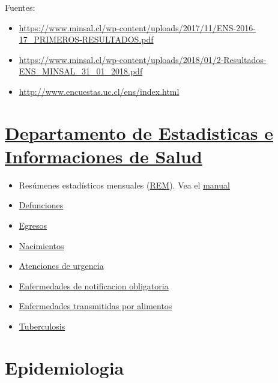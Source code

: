 \documentclass[]{book}
\providecommand{\tightlist}{%
  \setlength{\itemsep}{0pt}\setlength{\parskip}{0pt}}
\begin{document}
Fuentes:

\begin{itemize}
\tightlist
\item
  \url{https://www.minsal.cl/wp-content/uploads/2017/11/ENS-2016-17_PRIMEROS-RESULTADOS.pdf}
\item
  \url{https://www.minsal.cl/wp-content/uploads/2018/01/2-Resultados-ENS_MINSAL_31_01_2018.pdf}
\item
  \url{http://www.encuestas.uc.cl/ens/index.html}
\end{itemize}

\hypertarget{departamento-de-estadisticas-e-informaciones-de-salud}{%
\section{\texorpdfstring{\href{http://www.deis.cl/}{Departamento de Estadisticas e Informaciones de Salud}}{Departamento de Estadisticas e Informaciones de Salud}}\label{departamento-de-estadisticas-e-informaciones-de-salud}}

\begin{itemize}
\tightlist
\item
  Resúmenes estadísticos mensuales (\href{http://www.deis.cl/bases-de-datos-rem/}{REM}). Vea el \href{http://estadisticas.ssosorno.cl/estadisticas/2017/manuales/2017-2018-Manual-Series-REM-V1.1.pdf}{manual}
\item
  \href{http://www.deis.cl/bases-de-datos-defunciones/}{Defunciones}
\item
  \href{http://www.deis.cl/descargar-bases-de-datos-2/?page_id=3487}{Egresos}
\item
  \href{http://www.deis.cl/descargar-bases-de-datos-2/?page_id=3493}{Nacimientos}
\item
  \href{http://www.deis.cl/descargar-bases-de-datos-2/?page_id=3499}{Atenciones de urgencia}
\item
  \href{http://www.deis.cl/descargar-bases-de-datos-2/?page_id=3784}{Enfermedades de notificacion obligatoria}
\item
  \href{http://www.deis.cl/estadisticas-eta/}{Enfermedades transmitidas por alimentos}
\item
  \href{http://www.deis.cl/?page_id=3946}{Tuberculosis}
\end{itemize}

\hypertarget{epidemiologia}{%
\section{Epidemiologia}\label{epidemiologia}}
\end{document}
